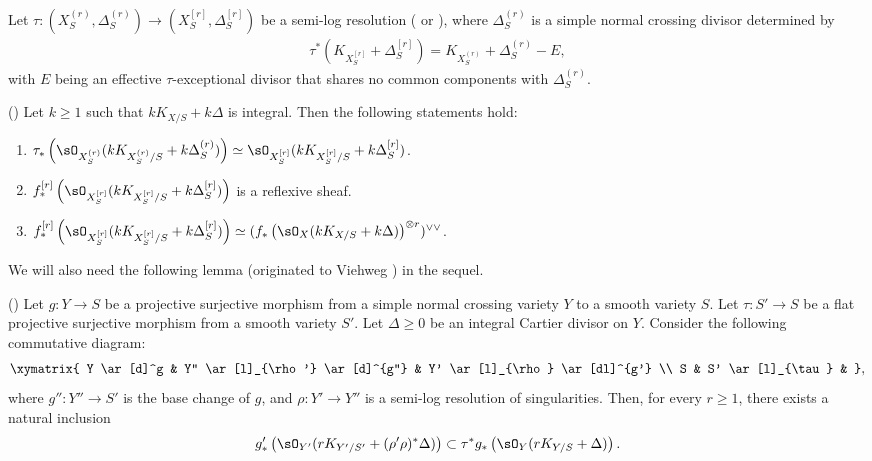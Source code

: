 \documentclass[11pt,letterpaper]{amsart}
\numberwithin{equation}{section}
\begin{document}
	Let $\tau: (X^{(r)}_S, \Delta^{(r)}_S) \to (X^{[r]}_S, \Delta^{[r]}_S)$ be a semi-log resolution (\cite{Bierstone2013} or \cite[\S 10.4]{Kollar2013}), where $\Delta^{(r)}_S$ is a simple normal crossing divisor determined by  
	\begin{align*}
		\tau^\ast(K_{X^{[r]}_S} + \Delta^{[r]}_S) = K_{X^{(r)}_S} + \Delta^{(r)}_S - E,  
	\end{align*}  
	with $E$ being an effective $\tau$-exceptional divisor that shares no common components with $\Delta^{(r)}_S$. 
	\begin{lem}(\cite[Lemma 5.4]{stjc2025})\label{lem_mild_pushforward}
		Let $k \geq 1$ such that $kK_{X/S} + k\Delta$ is integral. Then the following statements hold:  
		\begin{enumerate}
			\item $\tau_{\ast}\left(\sO_{X^{(r)}_S}(kK_{X^{(r)}_S/S}+k\Delta^{(r)}_S)\right)\simeq\sO_{X^{[r]}_S}(kK_{X^{[r]}_S/S}+k\Delta^{[r]}_S)$.
			\item $f^{[r]}_\ast\left(\sO_{X^{[r]}_S}(kK_{X^{[r]}_S/S}+k\Delta^{[r]}_S)\right)$ is a reflexive sheaf.
			\item $f^{[r]}_\ast\left(\sO_{X^{[r]}_S}(kK_{X^{[r]}_S/S}+k\Delta^{[r]}_S)\right)\simeq (f_\ast\left(\sO_X(kK_{X/S}+k\Delta)\right)^{\otimes r})^{\vee\vee}$.
		\end{enumerate}
	\end{lem}
	We will also need the following lemma (originated to Viehweg \cite{Viehweg1983}) in the sequel.
	\begin{lem}(\cite[Lemma 5.5]{stjc2025})\label{lem_Viehweg_inclusion}
		Let $g: Y \to S$ be a projective surjective morphism from a simple normal crossing variety $Y$ to a smooth variety $S$. Let $\tau: S' \to S$ be a flat projective surjective morphism from a smooth variety $S'$. Let $\Delta \geq 0$ be an integral Cartier divisor on $Y$. Consider the following commutative diagram:  
		\begin{align*}  
			\xymatrix{  
				Y \ar[d]^g & Y'' \ar[l]_{\rho'} \ar[d]^{g''} & Y' \ar[l]_{\rho} \ar[dl]^{g'} \\  
				S & S' \ar[l]_{\tau} &  
			},  
		\end{align*}  
		where $g'': Y'' \to S'$ is the base change of $g$, and $\rho: Y' \to Y''$ is a semi-log resolution of singularities. Then, for every $r \geq 1$, there exists a natural inclusion  
		$$  
		g'_\ast\left(\sO_{Y'}(rK_{Y'/S'} + (\rho'\rho)^\ast\Delta)\right) \subset \tau^\ast g_\ast\left(\sO_Y(rK_{Y/S} + \Delta)\right).  
		$$  
	\end{lem}
\end{document}
